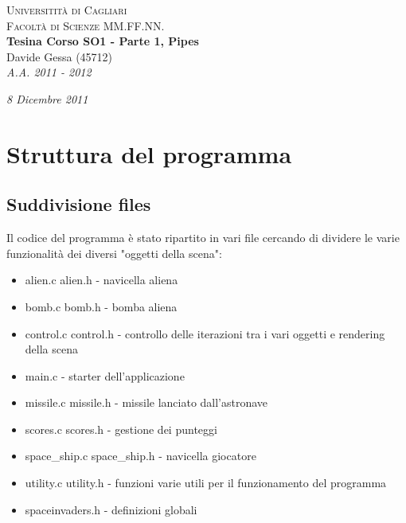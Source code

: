 \documentclass[a4paper,11pt]{report}
\begin{document}
\thispagestyle{empty}
\pagestyle{empty}

\begin{center}
\textsc{Universitità di Cagliari}\\[0.4cm]
\textsc{Facoltà di Scienze MM.FF.NN.}\\[5.5cm]

\textbf{{\large Tesina Corso SO1 - Parte 1, Pipes}}\\[0.6cm]
Davide Gessa (45712)\\[0.4cm]
\textit{A.A. 2011 - 2012\\[0.4cm]}

\vfill
\textit{8 Dicembre 2011\\[1.5cm]}


\end{center}

\newpage
\tableofcontents


\chapter{Struttura del programma}

\section{Suddivisione files}
Il codice del programma è stato ripartito in vari file cercando di dividere le varie 
funzionalità dei diversi "oggetti della scena":

\begin{itemize}
  \item alien.c alien.h - navicella aliena
  \item bomb.c bomb.h - bomba aliena
  \item control.c control.h - controllo delle iterazioni tra i vari oggetti e rendering della scena
  \item main.c - starter dell'applicazione
  \item missile.c missile.h - missile lanciato dall'astronave
  \item scores.c scores.h - gestione dei punteggi
  \item space_ship.c space_ship.h - navicella giocatore
  \item utility.c utility.h - funzioni varie utili per il funzionamento del programma
  \item spaceinvaders.h - definizioni globali
\end{itemize}
\end{document}
